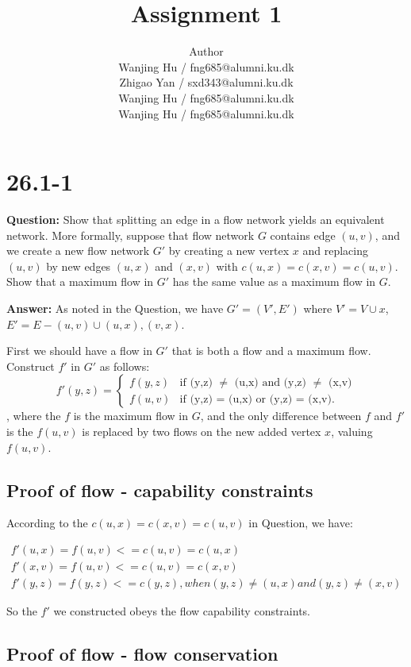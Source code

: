 \documentclass[12pt]{article}
\title{Assignment 1}
\author{Author \\
  Wanjing Hu / fng685@alumni.ku.dk  \\
  Zhigao Yan / sxd343@alumni.ku.dk  \\
  Wanjing Hu / fng685@alumni.ku.dk  \\
  Wanjing Hu / fng685@alumni.ku.dk  \\
}
\begin{document}
\maketitle


\section{26.1-1}
\textbf{Question: }Show that splitting an edge in a flow network yields an equivalent network. More formally, suppose that flow network $G$ contains edge $(u, v)$, and we create a new flow network $G'$ by creating a new vertex $x$ and replacing $(u, v)$ by new edges $(u, x)$ and $(x, v)$ with $c(u, x) = c(x, v) = c(u, v)$. Show that a maximum flow in $G'$ has the same value as a maximum flow in $G$.

\textbf{Answer: }As noted in the Question, we have $G'=(V',E')$ where $V'=V\cup{x}$, $E'=E-{(u,v)}\cup{(u,x), (v, x)}$.

First we should have a flow in $G'$ that is both a flow and a maximum flow. Construct $f'$ in $G'$ as follows:
\begin{equation}
f'(y,z) = 
\begin{cases}
f(y,z) &\mbox{if (y,z) $\neq$ (u,x) and (y,z) $\neq$ (x,v)}\\
f(u,v) &\mbox{if (y,z) = (u,x) or (y,z) = (x,v)}.
\end{cases}
\end{equation}
, where the $f$ is the maximum flow in $G$, and the only difference between $f$ and $f'$ is the $f(u,v)$ is replaced by two flows on the new added vertex $x$, valuing $f(u,v)$.

\subsection{Proof of flow - capability constraints}

According to the $c(u, x) = c(x, v) = c(u, v)$ in Question, we have:

\begin{gather}
f'(u,x) = f(u,v) <= c(u,v) = c(u,x)\\ \nonumber
f'(x,v) = f(u,v)<=c(u,v) = c(x,v)\\ \nonumber
f'(y,z) = f(y,z) <= c(y,z), when (y,z) \neq (u,x) and (y,z) \neq (x,v) \nonumber
\end{gather}

So the $f'$ we constructed obeys the flow capability constraints.

\subsection{Proof of flow - flow conservation}
\end{document}
